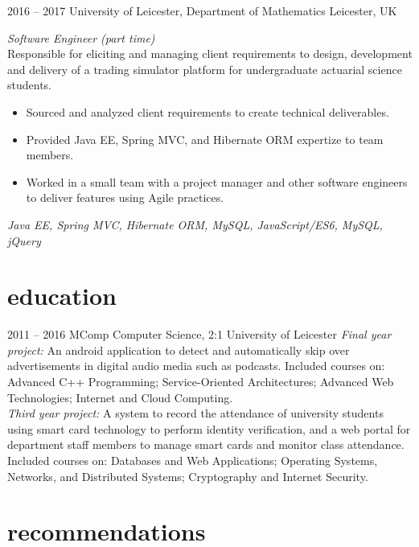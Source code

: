 \documentclass[]{friggeri-cv-a4} %
\begin{document}
\begin{entrylist}

\entry
{2016 -- 2017}
{University of Leicester, Department of Mathematics}
{Leicester, UK}
{\emph{Software Engineer (part time)} \\
Responsible for eliciting and managing client requirements to design, development and delivery of a trading simulator platform for undergraduate actuarial science students.
\begin{itemize}
\item Sourced and analyzed client requirements to create technical deliverables.
\item Provided Java EE, Spring MVC, and Hibernate ORM expertize to team members.
\item Worked in a small team with a project manager and other software engineers to deliver features using Agile practices.
\end{itemize}
\small{\textit{Java EE, Spring MVC, Hibernate ORM, MySQL, JavaScript/ES6, MySQL, jQuery}}
}

\end{entrylist}

\section{education}

\begin{entrylist}

\entry
{2011 -- 2016}
{MComp {\normalfont Computer Science}, 2:1}
{University of Leicester}
{
    \textit{Final year project:} An android application to detect and automatically skip over advertisements in digital audio media such as podcasts.
    Included courses on: Advanced C++ Programming; Service-Oriented Architectures; Advanced Web Technologies; Internet and Cloud Computing.
    \\\textit{Third year project:} A system to record the attendance of university students using smart card technology to perform identity verification, and a web portal for department staff members to manage smart cards and monitor class attendance.
    Included courses on: Databases and Web Applications; Operating Systems, Networks, and Distributed Systems; Cryptography and Internet Security.
}

\end{entrylist}

\section{recommendations}
\end{document}
